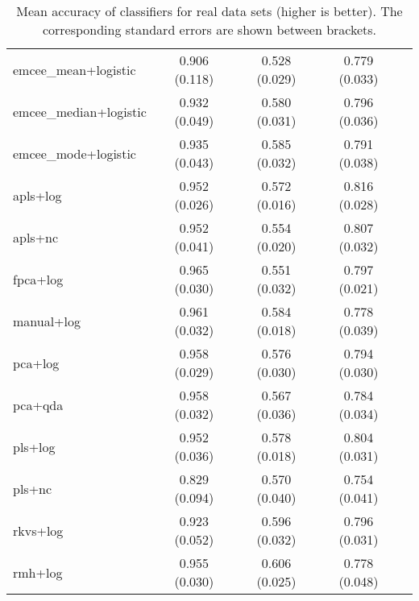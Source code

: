 \begin{table}[p]
\begin{tabular}{lcccc}
  emcee\_mean+logistic & 0.906 (0.118) & 0.528 (0.029) & 0.779 (0.033) \\
emcee\_median+logistic & 0.932 (0.049) & 0.580 (0.031) & 0.796 (0.036) \\
  emcee\_mode+logistic & 0.935 (0.043) & 0.585 (0.032) & 0.791 (0.038) \\
              apls+log & 0.952 (0.026) & 0.572 (0.016) & 0.816 (0.028) \\
              apls+nc & 0.952 (0.041) & 0.554 (0.020) & 0.807 (0.032) \\
             fpca+log & 0.965 (0.030) & 0.551 (0.032) & 0.797 (0.021) \\
           manual+log & 0.961 (0.032) & 0.584 (0.018) & 0.778 (0.039) \\
              pca+log & 0.958 (0.029) & 0.576 (0.030) & 0.794 (0.030) \\
              pca+qda & 0.958 (0.032) & 0.567 (0.036) & 0.784 (0.034) \\
              pls+log & 0.952 (0.036) & 0.578 (0.018) & 0.804 (0.031) \\
               pls+nc & 0.829 (0.094) & 0.570 (0.040) & 0.754 (0.041) \\
             rkvs+log & 0.923 (0.052) & 0.596 (0.032) & 0.796 (0.031) \\
              rmh+log & 0.955 (0.030) & 0.606 (0.025) & 0.778 (0.048) \\

\bottomrule
\end{tabular}
  \caption{Mean accuracy of classifiers for real data sets (higher is better). The corresponding standard errors are shown between brackets.}
\end{table}
